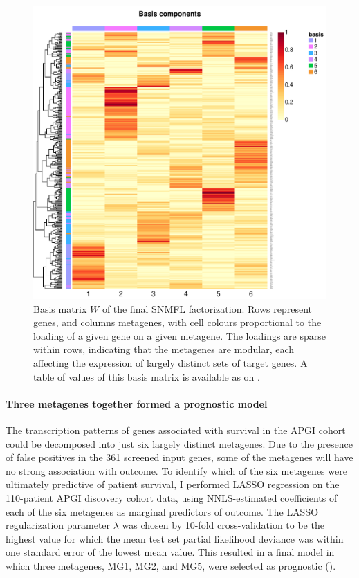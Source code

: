 \documentclass[dissertation.tex]{subfiles}
\begin{document}
\begin{figure}
\centering
\includegraphics[width=.7\linewidth]{analysis/biosurv/reports/18_SIS_diag_dsd_final/figure/nmf-plots-2}
\caption[Basis matrix $W$ of the final \acrshort{SNMFL} factorization]{Basis matrix $W$ of the final \acrshort{SNMFL} factorization.  Rows represent genes, and columns metagenes, with cell colours proportional to the loading of a given gene on a given metagene.  The loadings are sparse within rows, indicating that the metagenes are modular, each affecting the expression of largely distinct sets of target genes.  A table of values of this basis matrix is available as  on .}\label{fig:sigs-nmf-basis}
\end{figure}

\paragraph{Three metagenes together formed a prognostic model}
The transcription patterns of genes associated with survival in the \gls{APGI} cohort could be decomposed into just six largely distinct metagenes.  Due to the presence of false positives in the 361 screened input genes, some of the metagenes will have no strong association with outcome.  To identify which of the six metagenes were ultimately predictive of patient survival, I performed \gls{LASSO} regression on the 110-patient \gls{APGI} discovery cohort data, using \gls{NNLS}-estimated coefficients of each of the six metagenes as marginal predictors of outcome.  The \gls{LASSO} regularization parameter $\lambda$ was chosen by 10-fold cross-validation to be the highest value for which the mean test set partial likelihood deviance was within one standard error of the lowest mean value.  This resulted in a final model in which three metagenes, MG1, MG2, and MG5, were selected as prognostic ().
\end{document}
